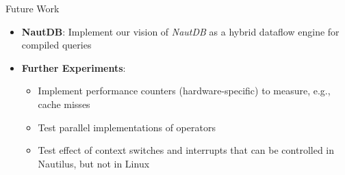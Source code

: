 \begin{block}{Future Work}
  \begin{itemize}
  \item \textbf{NautDB}: Implement our vision of \textit{NautDB} as a hybrid dataflow engine for compiled queries
  \item \textbf{Further Experiments}:
    \begin{itemize}
    \item Implement performance counters (hardware-specific) to measure, e.g., cache misses
    \item Test parallel implementations of operators
    \item Test effect of context switches and interrupts that can be controlled in Nautilus, but not in Linux
  \end{itemize}
  \end{itemize}
\end{block}

